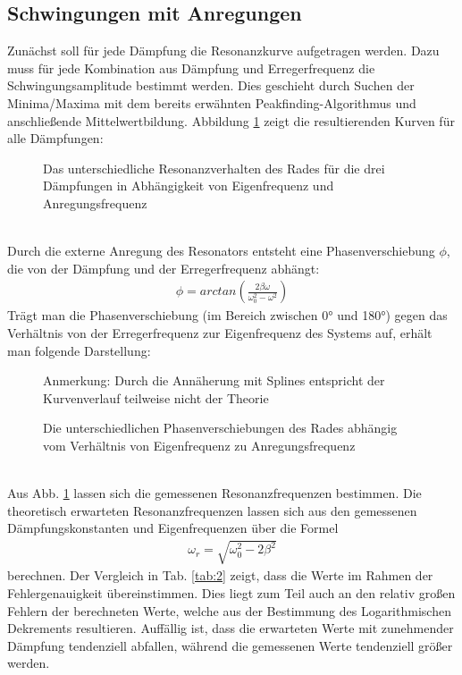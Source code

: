 \subsection{Schwingungen mit Anregungen}
Zunächst soll für jede Dämpfung die Resonanzkurve aufgetragen werden. Dazu  muss für jede Kombination aus Dämpfung und Erregerfrequenz die Schwingungsamplitude bestimmt werden. Dies geschieht durch Suchen der Minima/Maxima mit dem bereits erwähnten Peakfinding-Algorithmus und anschließende Mittelwertbildung. Abbildung \ref{img:2} zeigt die resultierenden Kurven für alle Dämpfungen:
\ \\
\begin{figure}[!htbp]
\centering

\caption{Das unterschiedliche Resonanzverhalten des Rades für die drei Dämpfungen in Abhängigkeit von Eigenfrequenz
und Anregungsfrequenz} 
\label{img:2}
\end{figure}
\newpage \ \\
Durch die externe Anregung des Resonators entsteht eine Phasenverschiebung $\phi$, die von der Dämpfung und der Erregerfrequenz abhängt:
\begin{align}
\phi=arctan\left(\frac{2\beta\omega}{\omega_0^{2}-\omega^{2}}\right) \nonumber
\end{align}
Trägt man die Phasenverschiebung (im Bereich zwischen 0° und 180°) gegen das Verhältnis von der Erregerfrequenz zur Eigenfrequenz des Systems auf, erhält man folgende Darstellung:
\begin{figure}[!htbp]

\caption{Die unterschiedlichen Phasenverschiebungen des Rades abhängig vom Verhältnis von Eigenfrequenz zu 
Anregungsfrequenz}{Anmerkung: Durch die Annäherung mit Splines entspricht der Kurvenverlauf teilweise nicht der Theorie} 
\end{figure}
\newpage \ \\
Aus Abb. \ref{img:2} lassen sich die gemessenen Resonanzfrequenzen bestimmen. Die theoretisch erwarteten Resonanzfrequenzen lassen sich aus den gemessenen Dämpfungskonstanten und Eigenfrequenzen über die Formel
\begin{align}
\omega_r = \sqrt{\omega_0^{2} - 2\beta^{2}} \nonumber
\end{align}
berechnen. Der Vergleich in Tab. \ref{tab:2} zeigt, dass die Werte im Rahmen der Fehlergenauigkeit übereinstimmen. Dies liegt zum Teil auch an den relativ großen Fehlern der berechneten Werte, welche aus der Bestimmung des Logarithmischen Dekrements resultieren. Auffällig ist, dass die erwarteten Werte mit zunehmender Dämpfung tendenziell abfallen, während die gemessenen Werte tendenziell größer werden. 
